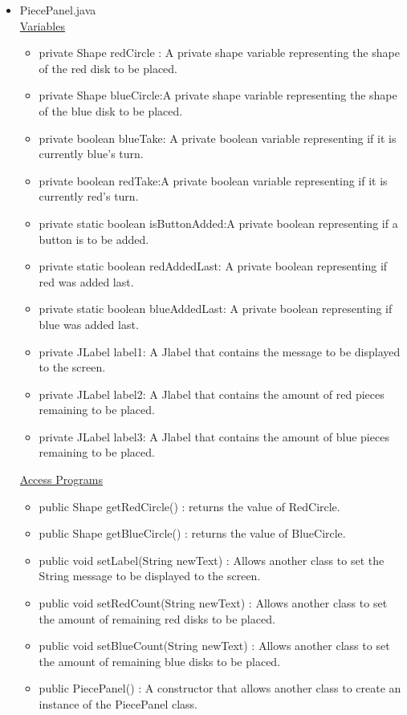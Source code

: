 \documentclass[12pt]{article}
\begin{document}
\begin{itemize}
		\item PiecePanel.java \\
		\underline{Variables}
		\begin{itemize}
			\item private Shape redCircle : A private shape variable representing the shape of the red disk to be placed.
			\item private Shape blueCircle:A private shape variable representing the shape of the blue disk to be placed.
			\item private boolean blueTake: A private boolean variable representing if it is currently blue's turn.
			\item private boolean redTake:A private boolean variable representing if it is currently red's turn.
			\item private static boolean isButtonAdded:A private boolean representing if a button is to be added.
			\item private static boolean redAddedLast: A private boolean representing if red was added last.
			\item private static boolean blueAddedLast: A private boolean representing if blue was added last.
			\item private JLabel label1: A Jlabel that contains the message to be displayed to the screen.
			\item private JLabel label2: A Jlabel that contains the amount of red pieces remaining to be placed.
			\item private JLabel label3: A Jlabel that contains the amount of blue pieces remaining to be placed.
		\end{itemize}
		\underline{Access Programs}
		\begin{itemize}
				\item public Shape getRedCircle() : returns the value of RedCircle.
				\item public Shape getBlueCircle() : returns the value of BlueCircle.
				\item public void setLabel(String newText) : Allows another class to set the String message to be displayed to the screen.
				\item public void setRedCount(String newText) : Allows another class to set the amount of remaining red disks to be placed.
				\item public void setBlueCount(String newText) : Allows another class to set the amount of remaining blue disks to be placed.
				\item public PiecePanel() : A constructor that allows another class to create an instance of the PiecePanel class.

\end{itemize}
\end{itemize}
\end{document}
